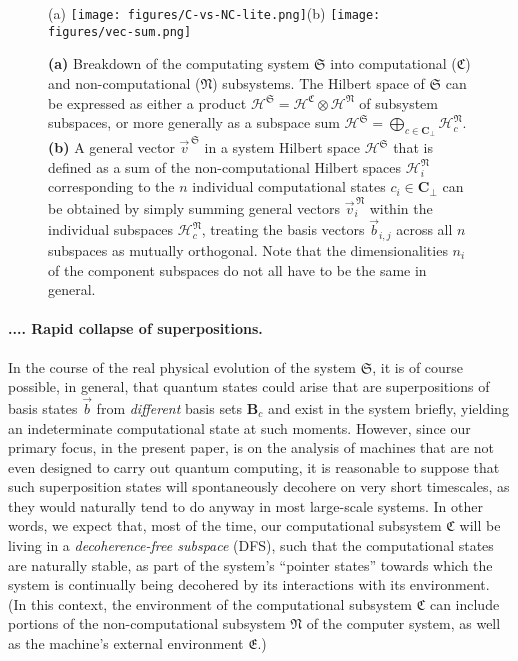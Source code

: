 \documentclass[preprints,article,accept,moreauthors,pdftex]{Definitions/mdpi}
\newcommand{\mypara}[1]{\paragraph{\arabic{section}.\arabic{subsection}.\arabic{subsubsection}.\arabic{paragraph}. #1}}
\begin{document}
\begin{figure}[t] %
\centerline{(a) \texttt{[image: figures/C-vs-NC-lite.png]}\hspace{1cm}(b) \texttt{[image: figures/vec-sum.png]}}
\caption{\textbf{(a)} Breakdown of the computating system $\mathfrak{S}$ into computational ($\mathfrak{C}$) and non-computational ($\mathfrak{N}$) subsystems. The Hilbert space of $\mathfrak{S}$ can be expressed as either a product $\mathcal{H}^\mathfrak{S} = \mathcal{H}^\mathfrak{C} \otimes \mathcal{H}^\mathfrak{N}$ of subsystem subspaces, or more generally as a subspace sum $\mathcal{H}^\mathfrak{S} = \bigoplus_{c\in\boldsymbol{C}_\bot} \mathcal{H}_c^\mathfrak{N}$. \textbf{(b)} A general vector $\vec{v}^{\,\mathfrak{S}}$ in a system Hilbert space $\mathcal{H}^\mathfrak{S}$ that is defined as a sum of the non-computational Hilbert spaces $\mathcal{H}_i^\mathfrak{N}$ corresponding to the $n$ individual computational states $c_i\in\mathbf{C}_\bot$ can be obtained by simply summing general vectors $\vec{v}_i^{\,\mathfrak{N}}$ within the individual subspaces $\mathcal{H}_c^\mathfrak{N}$, treating the basis vectors $\vec{b}_{i,j}$ across all $n$ subspaces as mutually orthogonal. Note that the dimensionalities $n_i$ of the component subspaces do not all have to be the same in general.\label{fig:c-vs-n}}
\end{figure}   

\mypara{Rapid collapse of superpositions.}\label{par:rapid-collapse}
In the course of the real physical evolution of the system $\mathfrak{S}$, it is of course possible, in general, that quantum states could arise that are superpositions of basis states $\vec{b}$ from \emph{different} basis sets $\boldsymbol{B}_c$ and exist in the system briefly, yielding an indeterminate computational state at such moments. However, since our primary focus, in the present paper, is on the analysis of machines that are not even designed to carry out quantum computing, it is reasonable to suppose that such superposition states will spontaneously decohere on very short timescales, as they would naturally tend to do anyway in most large-scale systems. In other words, we expect that, most of the time, our computational subsystem $\mathfrak{C}$ will be living in a {\em decoherence-free subspace} (DFS), such that the computational states are naturally stable, as part of the system's ``pointer states'' \cite{Zur03} towards which the system is continually being decohered by its interactions with its environment. (In this context, the environment of the computational subsystem $\mathfrak{C}$ can include portions of the non-computational subsystem $\mathfrak{N}$ of the computer system, as well as the machine's external environment $\mathfrak{E}$.)
\end{document}
